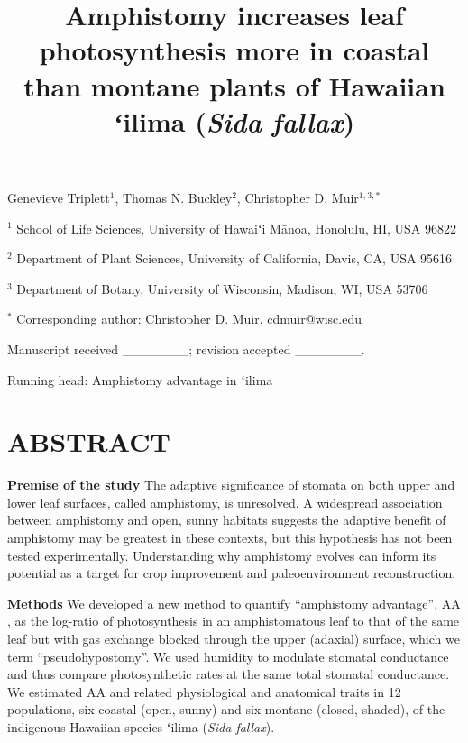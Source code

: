 \documentclass[
  letterpaper,
  DIV=11,
  numbers=noendperiod]{scrartcl}
\title{Amphistomy increases leaf photosynthesis more in coastal than
montane plants of Hawaiian ʻilima (\emph{Sida fallax})}
\author{}
\date{}
\begin{document}
\maketitle
\ifdefined\Shaded\renewenvironment{Shaded}{\begin{tcolorbox}[sharp corners, frame hidden, interior hidden, boxrule=0pt, borderline west={3pt}{0pt}{shadecolor}, breakable, enhanced]}{\end{tcolorbox}}\fi

\begin{center}
Genevieve Triplett$^1$, Thomas N. Buckley$^2$, Christopher D. Muir$^{1,3,*}$
\end{center}

\(^1\) School of Life Sciences, University of Hawaiʻi Mānoa, Honolulu,
HI, USA 96822

\(^2\) Department of Plant Sciences, University of California, Davis,
CA, USA 95616

\(^3\) Department of Botany, University of Wisconsin, Madison, WI, USA
53706

\(^*\) Corresponding author: Christopher D. Muir, cdmuir@wisc.edu

Manuscript received \_\_\_\_\_\_\_; revision accepted \_\_\_\_\_\_\_.

Running head: Amphistomy advantage in ʻilima

\newpage

\hypertarget{abstract}{%
\section{ABSTRACT ---}\label{abstract}}

\noindent \textbf{Premise of the study} The adaptive significance of
stomata on both upper and lower leaf surfaces, called amphistomy, is
unresolved. A widespread association between amphistomy and open, sunny
habitats suggests the adaptive benefit of amphistomy may be greatest in
these contexts, but this hypothesis has not been tested experimentally.
Understanding why amphistomy evolves can inform its potential as a
target for crop improvement and paleoenvironment reconstruction.

\textbf{Methods} We developed a new method to quantify ``amphistomy
advantage'', \(\mathrm{AA}\), as the log-ratio of photosynthesis in an
amphistomatous leaf to that of the same leaf but with gas exchange
blocked through the upper (adaxial) surface, which we term
``pseudohypostomy''. We used humidity to modulate stomatal conductance
and thus compare photosynthetic rates at the same total stomatal
conductance. We estimated \(\mathrm{AA}\) and related physiological and
anatomical traits in 12 populations, six coastal (open, sunny) and six
montane (closed, shaded), of the indigenous Hawaiian species ʻilima
(\emph{Sida fallax}).
\end{document}
